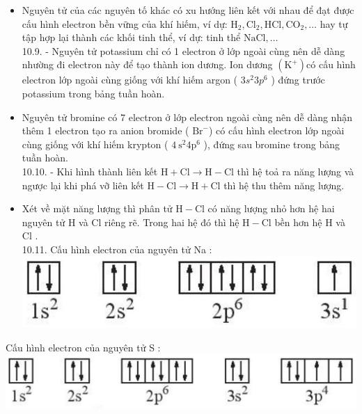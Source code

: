 \documentclass[10pt]{article}
\begin{document}
\begin{itemize}
  \item Nguyên tử của các nguyên tố khác có xu hướng liên kết với nhau để đạt được cấu hình electron bền vững của khí hiếm, ví dự: $\mathrm{H}_{2}, \mathrm{Cl}_{2}, \mathrm{HCl}, \mathrm{CO}_{2}, \ldots$ hay tự tập hợp lại thành các khối tinh thể, ví dự: tinh thể $\mathrm{NaCl}, \ldots$\\
10.9. - Nguyên tử potassium chỉ có 1 electron ở lớp ngoài cùng nên dễ dàng nhường đi electron này để tạo thành ion dương. Ion dương $\left(\mathrm{K}^{+}\right)$có cấu hình electron lớp ngoài cùng giống với khí hiếm argon ( $3 s^{2} 3 p^{6}$ ) đứng trước potassium trong bảng tuần hoàn.
  \item Nguyên tử bromine có 7 electron ở lớp electron ngoài cùng nên dễ dàng nhận thêm 1 electron tạo ra anion bromide ( $\mathrm{Br}^{-}$) có cấu hình electron lớp ngoài cùng giống với khí hiếm krypton ( $4 \mathrm{~s}^{2} 4 \mathrm{p}^{6}$ ), đứng sau bromine trong bảng tuần hoàn.\\
10.10. - Khi hình thành liên kết $\mathrm{H}+\mathrm{Cl} \rightarrow \mathrm{H}-\mathrm{Cl}$ thì hệ toả ra năng lượng và ngược lại khi phá vỡ liên kết $\mathrm{H}-\mathrm{Cl} \rightarrow \mathrm{H}+\mathrm{Cl}$ thì hệ thu thêm năng lượng.
  \item Xét về mặt năng lượng thì phân tử $\mathrm{H}-\mathrm{Cl}$ có năng lượng nhỏ hơn hệ hai nguyên tử H và Cl riêng rẽ. Trong hai hệ đó thì hệ $\mathrm{H}-\mathrm{Cl}$ bền hơn hệ H và Cl .\\
10.11. Cấu hình electron của nguyên tử Na :\\
\includegraphics[max width=\textwidth, center]{2025_10_23_ee735750217b2aca435cg-23(1)}
\end{itemize}

Cấu hình electron của nguyên tử S :\\
\includegraphics[max width=\textwidth, center]{2025_10_23_ee735750217b2aca435cg-23}
\end{document}
